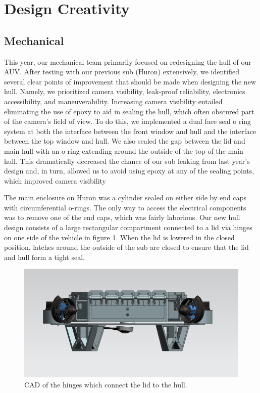 \documentclass[conference]{IEEEtran}
\begin{document}
\section{Design Creativity}

\subsection{Mechanical}
This year, our mechanical team primarily focused on redesigning the hull of our AUV. After testing with our previous sub (Huron) extensively, we identified several clear points of improvement that should be made when designing the new hull. Namely, we prioritized camera visibility, leak-proof reliability, electronics accessibility, and maneuverability. Increasing camera visibility entailed eliminating the use of epoxy to aid in sealing the hull, which often obscured part of the camera's field of view. To do this, we implemented a dual face seal o ring system at both the interface between the front window and hull and the interface between the top window and hull. We also sealed the gap between the lid and main hull with an o-ring extending around the outside of the top of the main hull. This dramatically decreased the chance of our sub leaking from last year's design and, in turn, allowed us to avoid using epoxy at any of the sealing points, which improved camera visibility


The main enclosure on Huron was a cylinder sealed on either side by end caps with circumferential o-rings. The only way to access the electrical components was to remove one of the end caps, which was fairly laborious. Our new hull design consists of a large rectangular compartment connected to a lid via hinges on one side of the vehicle in figure \ref{fig:sub6}. When the lid is lowered in the closed position, latches around the outside of the sub are closed to ensure that the lid and hull form a tight seal.

\begin{figure}[htbp]
    \centerline{\includegraphics[scale=0.5]{images/sub6.PNG}}
    \caption{CAD of the hinges which connect the lid to the hull.}
    \label{fig:sub6}
\end{figure}
\end{document}
